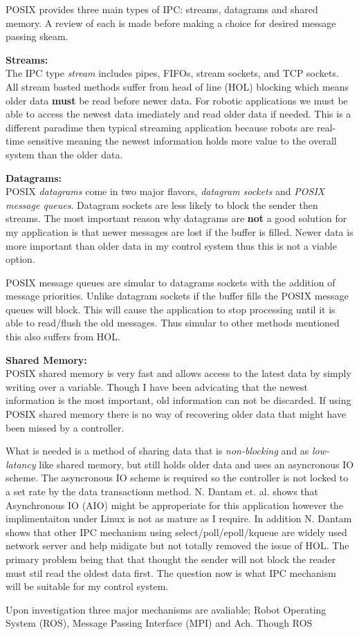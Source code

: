 POSIX provides three main types of IPC: streams, datagrams and shared memory.  
A review of each is made before making a choice for desired message passing skeam.

\noindent \textbf{Streams:}\\
The IPC type \textit{stream} includes pipes, FIFOs, stream sockets, and TCP sockets.
All stream basted methods suffer from head of line (HOL) blocking which means older data \textbf{must} be read before newer data.
For robotic applications we must be able to access the newest data imediately and read older data if needed.
This is a different paradime then typical streaming application because robots are real-time sensitive meaning the newest information holds more value to the overall system than the older data.

\noindent \textbf{Datagrams:}\\
POSIX \textit{datagrams} come in two major flavors, \textit{datagram sockets} and \textit{POSIX message queues}.
Datagram sockets are less likely to block the sender then streams.
The most important reason why datagrams are \textbf{not} a good solution for my application is that newer messages are lost if the buffer is filled.
Newer data is more important than older data in my control system thus this is not a viable option.

POSIX message queues are simular to datagrams sockets with the addition of message priorities.
Unlike datagram sockets if the buffer fills the POSIX message queues will block.
This will cause the application to stop processing until it is able to read/flush the old messages.
Thus simular to other methods mentioned this also suffers from HOL.

\noindent \textbf{Shared Memory:}\\
POSIX shared memory is very fast and allows access to the latest data by simply writing over a variable.
Though I have been advicating that the newest information is the most important, old information can not be discarded.
If using POSIX shared memory there is no way of recovering older data that might have been missed by a controller.

What is needed is a method of sharing data that is \textit{non-blocking} and as \textit{low-latancy} like shared memory, but still holds older data and uses an asyncronous IO scheme.
The asyncronous IO scheme is required so the controller is not locked to a set rate by the data transactionn method.
N. Dantam et. al.\cite{ach} shows that Asynchronous IO (AIO) might be approperiate for this application however the implimentaiton under Linux is not as mature as I require.
In addition N. Dantam shows that other IPC mechanism using select/poll/epoll/kqueue are widely used network server and help midigate but not totally removed the issue of HOL.
The primary problem being that that thought the sender will not block the reader must stil read the oldest data first.
The question now is what IPC mechanism will be suitable for my control system.

Upon investigation three major mechanisms are avaliable; Robot Operating System (ROS)\cite{ros}, Message Passing Interface (MPI)\cite{Gropp:1999:UMP:330577} and Ach\cite{ach}.
Though ROS 
